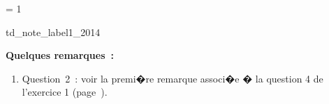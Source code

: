 \ifnum\correctionenonce = 1

\begin{xdemoexonot}{td_note_label1_2014}


\textbf{Quelques remarques~:}

\begin{enumerate}
\item Question~2~: voir la premi�re remarque associ�e � la question 4 de l'exercice 1 (page~\pageref{rem2014_q4_ex1}).
\end{enumerate}


\end{xdemoexonot}
\fi





%
